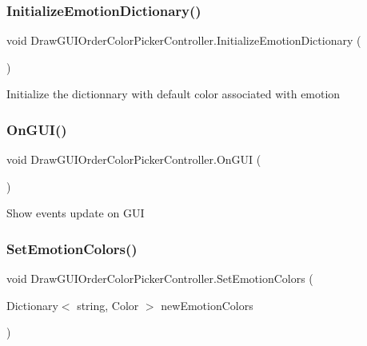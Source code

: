 \subsubsection{\texorpdfstring{Initialize\+Emotion\+Dictionary()}{InitializeEmotionDictionary()}}
{\footnotesize\ttfamily void Draw\+G\+U\+I\+Order\+Color\+Picker\+Controller.\+Initialize\+Emotion\+Dictionary (\begin{DoxyParamCaption}{ }\end{DoxyParamCaption})}

Initialize the dictionnary with default color associated with emotion \mbox{\label{class_draw_g_u_i_order_color_picker_controller_a4c368507ba0d1c2f1896a38e5aec8006}} 
\subsubsection{\texorpdfstring{On\+G\+U\+I()}{OnGUI()}}
{\footnotesize\ttfamily void Draw\+G\+U\+I\+Order\+Color\+Picker\+Controller.\+On\+G\+UI (\begin{DoxyParamCaption}{ }\end{DoxyParamCaption})\hspace{0.3cm}{\ttfamily [private]}}

Show events update on G\+UI \mbox{\label{class_draw_g_u_i_order_color_picker_controller_a5afb3719ebda5e3f86b3106c23c6591b}} 
\subsubsection{\texorpdfstring{Set\+Emotion\+Colors()}{SetEmotionColors()}}
{\footnotesize\ttfamily void Draw\+G\+U\+I\+Order\+Color\+Picker\+Controller.\+Set\+Emotion\+Colors (\begin{DoxyParamCaption}\item[{Dictionary$<$ string, Color $>$}]{new\+Emotion\+Colors }\end{DoxyParamCaption})}


